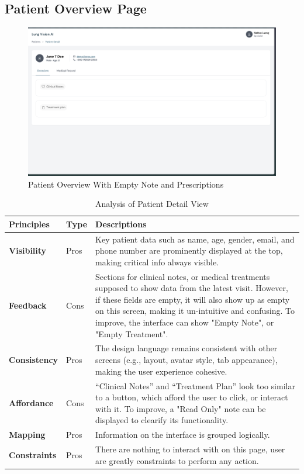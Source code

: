 \documentclass[12pt, titlepage]{article}
\begin{document}
\newpage
\subsection{Patient Overview Page}

  \begin{figure}[ht!] 
    \centering
    \includegraphics[scale=0.25]{../assets/patient_overview.png}
    \caption{Patient Overview With Empty Note and Prescriptions}
    \label{fig:patient_overview}
  \end{figure}

\begin{table}[h!]
    \centering
    \begin{tabular}{|p{2.5cm}|p{1.5cm}|p{11cm}|}
    \hline
    \rowcolor{gray!30}
    \textbf{Principles} & \textbf{Type} & \textbf{Descriptions} \\
    \hline
    \textbf{Visibility} & Pros & Key patient data such as name, age, gender, email, and phone number are prominently displayed at the top, making critical info always visible. \\
    \hline
    \textbf{Feedback} & Cons & Sections for clinical notes, or medical treatments supposed to show data from the latest visit. However, if these fields are empty, it will also show up as empty on this screen, making it un-intuitive and confusing. To improve,  the interface can show "Empty Note", or "Empty Treatment".\\
    \hline
    \textbf{Consistency} & Pros & The design language remains consistent with other screens (e.g., layout, avatar style, tab appearance), making the user experience cohesive. \\
    \hline
    \textbf{Affordance} & Cons & “Clinical Notes” and “Treatment Plan” look too similar to a button, which afford the user to click, or interact with it. To improve, a "Read Only" note can be displayed to clearify its functionality.\\
    \hline
    \textbf{Mapping} & Pros & Information on the interface is grouped logically. \\
    \hline
    \textbf{Constraints} & Pros & There are nothing to interact with on this page, user are greatly constraints to perform any action. \\
    \hline
    \end{tabular}
    \caption{Analysis of Patient Detail View}
\end{table}
\end{document}

